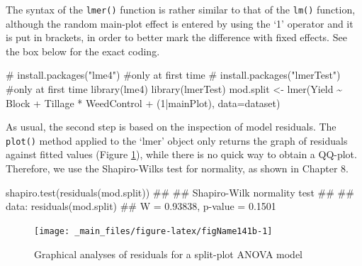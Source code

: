 \documentclass[a4paper,12pt,oneside]{book}
\newenvironment{Shaded}{\begin{snugshade}}{\end{snugshade}}
\newcommand{\DecValTok}[1]{#1}
\newcommand{\SpecialCharTok}[1]{#1}
\newcommand{\CommentTok}[1]{#1}
\newcommand{\DocumentationTok}[1]{#1}
\newcommand{\OtherTok}[1]{#1}
\newcommand{\FunctionTok}[1]{#1}
\newcommand{\AttributeTok}[1]{#1}
\newcommand{\NormalTok}[1]{#1}
\begin{document}
The syntax of the \texttt{lmer()} function is rather similar to that of the \texttt{lm()} function, although the random main-plot effect is entered by using the `1\textbar{}' operator and it is put in brackets, in order to better mark the difference with fixed effects. See the box below for the exact coding.

\begin{Shaded}
\begin{Highlighting}[]
\CommentTok{\# install.packages("lme4")  \#only at first time}
\CommentTok{\# install.packages("lmerTest")  \#only at first time}
\FunctionTok{library}\NormalTok{(lme4)}
\FunctionTok{library}\NormalTok{(lmerTest)}
\NormalTok{mod.split }\OtherTok{\textless{}{-}} \FunctionTok{lmer}\NormalTok{(Yield }\SpecialCharTok{\textasciitilde{}}\NormalTok{ Block }\SpecialCharTok{+}\NormalTok{ Tillage }\SpecialCharTok{*}\NormalTok{ WeedControl }\SpecialCharTok{+}
\NormalTok{                  (}\DecValTok{1}\SpecialCharTok{|}\NormalTok{mainPlot), }\AttributeTok{data=}\NormalTok{dataset)}
\end{Highlighting}
\end{Shaded}

As usual, the second step is based on the inspection of model residuals. The \texttt{plot()} method applied to the `lmer' object only returns the graph of residuals against fitted values (Figure \ref{fig:figName141b}), while there is no quick way to obtain a QQ-plot. Therefore, we use the Shapiro-Wilks test for normality, as shown in Chapter 8.

\begin{Shaded}
\begin{Highlighting}[]
\FunctionTok{shapiro.test}\NormalTok{(}\FunctionTok{residuals}\NormalTok{(mod.split))}
\DocumentationTok{\#\# }
\DocumentationTok{\#\#  Shapiro{-}Wilk normality test}
\DocumentationTok{\#\# }
\DocumentationTok{\#\# data:  residuals(mod.split)}
\DocumentationTok{\#\# W = 0.93838, p{-}value = 0.1501}
\end{Highlighting}
\end{Shaded}

\begin{figure}

{\centering \texttt{[image: \_main\_files/figure-latex/figName141b-1]} 

}

\caption{Graphical analyses of residuals for a split-plot ANOVA model}\label{fig:figName141b}
\end{figure}
\end{document}
